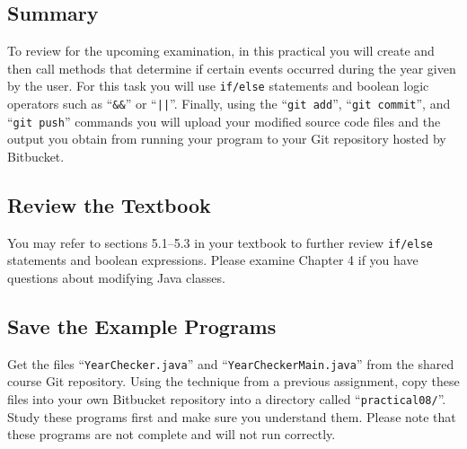 



\subsection*{Summary}
\vspace*{-.05in}

To review for the upcoming examination, in this practical you will create and then call methods that determine if
certain events occurred during the year given by the user. For this task you will use {\tt if/else} statements and
boolean logic operators such as ``{\tt \&\&}'' or ``{\tt ||}''.  Finally, using the ``{\tt git add}'', ``{\tt git
commit}'', and ``{\tt git push}'' commands you will upload your modified source code files and the output you obtain
from running your program to your Git repository hosted by Bitbucket.

\vspace*{-.1in}
\subsection*{Review the Textbook}
\vspace*{-.05in}

You may refer to sections 5.1--5.3 in your textbook to further review {\tt if/else} statements and boolean
expressions.  Please examine Chapter 4 if you have questions about modifying Java classes.

\vspace*{-.1in}
\subsection*{Save the Example Programs}
\vspace*{-.05in}

Get the files ``{\tt YearChecker.java}'' and ``{\tt YearCheckerMain.java}'' from the shared course Git repository. Using
the technique from a previous assignment, copy these files into your own Bitbucket repository into a directory called
``{\tt practical08/}''. Study these programs first and make sure you understand them. Please note that these programs
are not complete and will not run correctly.

\vspace*{-.1in}
